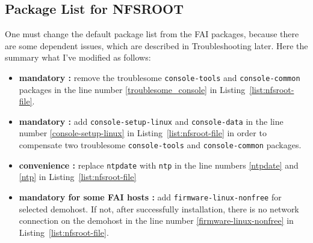 \documentclass[11pt
  , a4paper
  , article
  , oneside
]{memoir}
\begin{document}
\subsection{Package List for NFSROOT}
One must change the default package list from the FAI packages, because there are some dependent issues, which are described in Troubleshooting later. Here the summary what I've modified as follows:
\begin{itemize}
  \item \textbf{mandatory :} remove the troublesome \texttt{console-tools} and \texttt{console-common} packages in the line number \ref{troublesome_console} in Listing~\ref{list:nfsroot-file}.
  \item \textbf{mandatory :} add \texttt{console-setup-linux} and \texttt{console-data} in the line number \ref{console-setup-linux} in Listing~\ref{list:nfsroot-file} in order to compensate two troublesome \texttt{console-tools} and \texttt{console-common} packages.
  \item \textbf{convenience :} replace \texttt{ntpdate} with \texttt{ntp} in the line numbers \ref{ntpdate} and \ref{ntp} in Listing~\ref{list:nfsroot-file}
  \item \textbf{mandatory for some FAI hosts :} add \texttt{firmware-linux-nonfree} for selected demohost. If not, after successfully installation, there is no network connection on the demohost in the line number \ref{firmware-linux-nonfree} in Listing~\ref{list:nfsroot-file}. 
\end{itemize}
\end{document}
